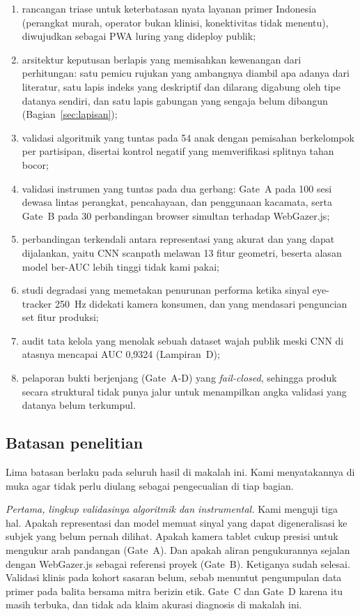 \documentclass{article}
\begin{document}
\begin{enumerate}[label=(\roman*)]
\item rancangan triase untuk keterbatasan nyata layanan primer Indonesia (perangkat murah,
      operator bukan klinisi, konektivitas tidak menentu), diwujudkan sebagai PWA luring yang
      dideploy publik;
\item arsitektur keputusan berlapis yang memisahkan kewenangan dari perhitungan: satu pemicu
      rujukan yang ambangnya diambil apa adanya dari literatur, satu lapis indeks yang
      deskriptif dan dilarang digabung oleh tipe datanya sendiri, dan satu lapis gabungan
      yang sengaja belum dibangun (Bagian~\ref{sec:lapisan});
\item validasi algoritmik yang tuntas pada 54 anak dengan pemisahan berkelompok per
      partisipan, disertai kontrol negatif yang memverifikasi splitnya tahan bocor;
\item validasi instrumen yang tuntas pada dua gerbang: Gate~A pada 100 sesi dewasa lintas
      perangkat, pencahayaan, dan penggunaan kacamata, serta Gate~B pada 30 perbandingan
      browser simultan terhadap WebGazer.js;
\item perbandingan terkendali antara representasi yang akurat dan yang dapat dijalankan,
      yaitu CNN scanpath melawan 13 fitur geometri, beserta alasan model ber-AUC lebih tinggi
      tidak kami pakai;
\item studi degradasi yang memetakan penurunan performa ketika sinyal eye-tracker 250~Hz
      didekati kamera konsumen, dan yang mendasari penguncian set fitur produksi;
\item audit tata kelola yang menolak sebuah dataset wajah publik meski CNN di atasnya
      mencapai AUC 0,9324 (Lampiran~D);
\item pelaporan bukti berjenjang (Gate~A-D) yang \emph{fail-closed}, sehingga produk secara
      struktural tidak punya jalur untuk menampilkan angka validasi yang datanya belum
      terkumpul.
\end{enumerate}

\subsection{Batasan penelitian}
\label{sec:batasan}

Lima batasan berlaku pada seluruh hasil di makalah ini. Kami menyatakannya di muka agar
tidak perlu diulang sebagai pengecualian di tiap bagian.

\emph{Pertama, lingkup validasinya algoritmik dan instrumental.} Kami menguji tiga hal.
Apakah representasi dan model memuat sinyal yang dapat digeneralisasi ke subjek yang belum
pernah dilihat. Apakah kamera tablet cukup presisi untuk mengukur arah pandangan (Gate~A).
Dan apakah aliran pengukurannya sejalan dengan WebGazer.js sebagai referensi proyek (Gate~B). Ketiganya sudah
selesai. Validasi klinis pada kohort sasaran belum, sebab menuntut pengumpulan data primer
pada balita bersama mitra berizin etik. Gate~C dan Gate~D karena itu masih terbuka,
dan tidak ada klaim akurasi diagnosis di makalah ini.
\end{document}
